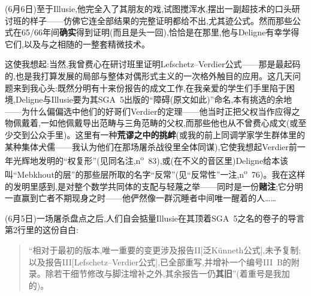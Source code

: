 (6月6日)至于Illusie,他完全入了其朋友的戏,试图搅浑水,摆出一副超技术的口头研讨班的样子——仿佛它连全部结果的完整证明都给不出,尤其迹公式。然而那些公式在65/66年间\textbf{确实}得到证明(而且是头一回),恰恰是在那里,他与Deligne有幸学得它们,以及与之相随的一整套精微技术。

\dmark{}这使我想起:当然,我曾费心在研讨班里证明Lefschetz--Verdier公式——那是最起码的,也是我打算发展的局部与整体对偶形式主义的一次格外触目的应用。这几天问题来到我心头:既然分明有十来份报告的成文工作,在我亲爱的学生们手里陷于困境,Deligne与Illusie要为其SGA~5出版的“障碍(原文如此)”命名,本有挑选的余地——为什么偏偏选中他们的好哥们Verdier的定理——他当时正把父权当作应得之物佩戴着,一如他佩戴导出范畴与三角范畴的父权,而那些他也从不曾费心成文(或至少交到公众手里)。这里有一种\textbf{荒谬之中的挑衅}(或我的前上同调学家学生群体里的某种集体犬儒——我认为他们在那场屠杀战役里全体同谋),它使我想起Verdier前一年光辉地发明的“权复形”(见同名注,n\textsuperscript{o}~83),或(在不义的音区里)Deligne给本该叫“Mebkhout的层”的那些层所取的名字“反常”(见“反常性”一注,n\textsuperscript{o}~76)。我在这样的发明里感到,是对整个数学共同体的支配与轻蔑之举——同时是一份\textbf{赌注};它分明一直赢到亡者不期现身之时——他俨然像一群沉睡者中间唯一醒着的人……


(6月5日)一场屠杀盘点之后,人们自会掂量Illusie在其顶着SGA~5之名的卷子的导言第2行里的这份自白:

\begin{quote}
“相对于最初的版本,唯一重要的变更涉及报告II[泛Künneth公式],未予复制;以及报告III[Lefschetz--Verdier公式],已全部重写,并增补一个编号III~B的附录。除若干\dmark{}细节修改与脚注增补之外,其余报告一仍\textbf{其旧}”(着重号是我加的)。
\end{quote}

